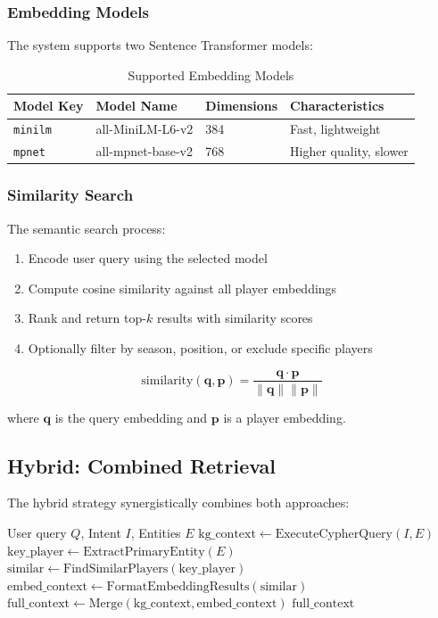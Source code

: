 \documentclass[11pt, a4paper]{article}
\begin{document}
\subsubsection{Embedding Models}
The system supports two Sentence Transformer models:

\begin{table}[H]
\centering
\caption{Supported Embedding Models}
\label{tab:embedding_models}
\begin{tabular}{@{}llll@{}}
\toprule
\textbf{Model Key} & \textbf{Model Name} & \textbf{Dimensions} & \textbf{Characteristics} \\
\midrule
\texttt{minilm} & all-MiniLM-L6-v2 & 384 & Fast, lightweight \\
\texttt{mpnet} & all-mpnet-base-v2 & 768 & Higher quality, slower \\
\bottomrule
\end{tabular}
\end{table}

\subsubsection{Similarity Search}
The semantic search process:
\begin{enumerate}
    \item Encode user query using the selected model
    \item Compute cosine similarity against all player embeddings
    \item Rank and return top-$k$ results with similarity scores
    \item Optionally filter by season, position, or exclude specific players
\end{enumerate}

\begin{equation}
\text{similarity}(\mathbf{q}, \mathbf{p}) = \frac{\mathbf{q} \cdot \mathbf{p}}{\|\mathbf{q}\| \|\mathbf{p}\|}
\end{equation}

where $\mathbf{q}$ is the query embedding and $\mathbf{p}$ is a player embedding.

\subsection{Hybrid: Combined Retrieval}
The hybrid strategy synergistically combines both approaches:

\begin{algorithm}[H]
\caption{Hybrid Retrieval Strategy}
\begin{algorithmic}[1]
\Require User query $Q$, Intent $I$, Entities $E$
\State $\text{kg\_context} \gets \text{ExecuteCypherQuery}(I, E)$ 
    \State $\text{key\_player} \gets \text{ExtractPrimaryEntity}(E)$
    \State $\text{similar} \gets \text{FindSimilarPlayers}(\text{key\_player})$
    \State $\text{embed\_context} \gets \text{FormatEmbeddingResults}(\text{similar})$
\EndIf
\State $\text{full\_context} \gets \text{Merge}(\text{kg\_context}, \text{embed\_context})$
\State \Return $\text{full\_context}$
\end{algorithmic}
\end{algorithm}
\end{document}
